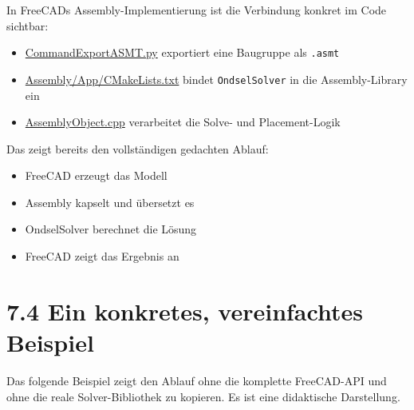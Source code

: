 \documentclass[
  12pt
]{book}
\providecommand{\tightlist}{%
  \setlength{\itemsep}{0pt}\setlength{\parskip}{0pt}}
\begin{document}
In FreeCADs Assembly-Implementierung ist die Verbindung konkret im Code
sichtbar:

\begin{itemize}
\tightlist
\item
  \href{https://github.com/FreeCAD/FreeCAD/blob/main/src/Mod/Assembly/CommandExportASMT.py}{CommandExportASMT.py}
  exportiert eine Baugruppe als \texttt{.asmt}
\item
  \href{https://github.com/FreeCAD/FreeCAD/blob/main/src/Mod/Assembly/App/CMakeLists.txt}{Assembly/App/CMakeLists.txt}
  bindet \texttt{OndselSolver} in die Assembly-Library ein
\item
  \href{https://github.com/FreeCAD/FreeCAD/blob/main/src/Mod/Assembly/App/AssemblyObject.cpp}{AssemblyObject.cpp}
  verarbeitet die Solve- und Placement-Logik
\end{itemize}

Das zeigt bereits den vollständigen gedachten Ablauf:

\begin{itemize}
\tightlist
\item
  FreeCAD erzeugt das Modell
\item
  Assembly kapselt und übersetzt es
\item
  OndselSolver berechnet die Lösung
\item
  FreeCAD zeigt das Ergebnis an
\end{itemize}

\hypertarget{ein-konkretes-vereinfachtes-beispiel}{%
\section{\texorpdfstring{{7.4} Ein konkretes, vereinfachtes
Beispiel}{7.4 Ein konkretes, vereinfachtes Beispiel}}\label{ein-konkretes-vereinfachtes-beispiel}}

Das folgende Beispiel zeigt den Ablauf ohne die komplette FreeCAD-API
und ohne die reale Solver-Bibliothek zu kopieren. Es ist eine
didaktische Darstellung.
\end{document}
